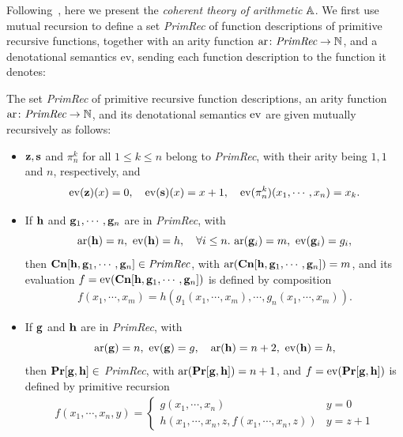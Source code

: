 Following~\citet{ye_categorical_2026}, here we present the \emph{coherent theory of arithmetic} $\mathbb{A}$. We first use mutual recursion to define a set \emph{PrimRec} of function descriptions of primitive recursive functions, together with an arity function $\mathrm{ar} \colon \textit{PrimRec} \to \mathbb{N}$, and a denotational semantics $\mathrm{ev}$, sending each function description to the function it denotes:

\begin{definition}\label{def:funcdesc}
  The set \emph{PrimRec} of primitive recursive function descriptions, an arity function $\mathrm{ar} \colon \textit{PrimRec} \to \mathbb{N}$, and its denotational semantics $\mathrm{ev}$ are given mutually recursively as follows:
  \begin{itemize}
  \item $\mathbf{z},\mathbf{s}$ and $\pi_n^k$ for all $1 \le k \le n$ belong to \emph{PrimRec}, with their arity being $1,1$ and $n$, respectively, and
    \[ \mathrm{ev}(\mathbf{z})(x) = 0, \quad \mathrm{ev}(\mathbf{s})(x) = x+1, \quad \mathrm{ev}(\pi_n^k)(x_1,\cdots,x_n) = x_k. \]
  \item If $\mathbf{h}$ and $\mathbf{g}_1,\cdots,\mathbf{g}_n$ are in \emph{PrimRec}, with
    \[ \mr{ar}(\mb h) = n,\ \mathrm{ev}(\mb h) = h, \quad \forall i \le n.\ \mr{ar}(\mb g_i) = m,\ \mathrm{ev}(\mb g_i) = g_i, \]
    then $\mathbf{Cn}[\mathbf{h},\mathbf{g}_1,\cdots,\mathbf{g}_n] \in \textit{PrimRec}$, with $\mathrm{ar}(\mathbf{Cn}[\mathbf{h},\mathbf{g}_1,\cdots,\mathbf{g}_n]) = m$, and its evaluation $f = \mathrm{ev}(\mathbf{Cn}[\mathbf{h},\mathbf{g}_1,\cdots,\mathbf{g}_n])$ is defined by composition
    \begin{align*}
      f(x_1,\cdots,x_m) = h(g_1(x_1,\cdots,x_m),\cdots,g_n(x_1,\cdots,x_m)). 
    \end{align*}
  \item If $\mathbf{g}$ and $\mathbf{h}$ are in \emph{PrimRec}, with
    \[ \mathrm{ar}(\mathbf{g}) = n,\ \mathrm{ev}(\mathbf{g}) = g, \quad \mathrm{ar}(\mathbf{h}) = n+2,\ \mathrm{ev}(\mathbf{h}) = h, \]
    then $\mathbf{Pr}[\mathbf{g},\mathbf{h}]\in$ \emph{PrimRec}, with $\mathrm{ar}(\mathbf{Pr}[\mathbf{g},\mathbf{h}]) = n+1$, and $f = \mathrm{ev}(\mathbf{Pr}[\mathbf{g},\mathbf{h}])$ is defined by primitive recursion
    \begin{align*}
      f(x_1,\cdots,x_n,y) =
      \begin{cases}
        g(x_1,\cdots,x_n) & y = 0 \\
        h(x_1,\cdots,x_n,z,f(x_1,\cdots,x_n,z)) & y = z + 1
      \end{cases}
    \end{align*}
  \end{itemize}
\end{definition}

